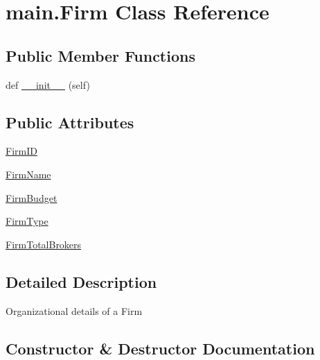 \hypertarget{classmain_1_1_firm}{}\section{main.\+Firm Class Reference}
\label{classmain_1_1_firm}
\subsection*{Public Member Functions}
\begin{DoxyCompactItemize}
\item 
def \hyperlink{classmain_1_1_firm_a214ed9603d9ff27e3e7d7458489d805d}{\+\_\+\+\_\+init\+\_\+\+\_\+} (self)
\end{DoxyCompactItemize}
\subsection*{Public Attributes}
\begin{DoxyCompactItemize}
\item 
\hyperlink{classmain_1_1_firm_a6052c1ccbd8ba8a8c7c7401ea8971343}{Firm\+I\+D}
\item 
\hyperlink{classmain_1_1_firm_a634868ce6def63b2a93c112f7e4e7c67}{Firm\+Name}
\item 
\hyperlink{classmain_1_1_firm_a8523fa1017684ff6c82f9d1dfc183135}{Firm\+Budget}
\item 
\hyperlink{classmain_1_1_firm_ab005092f1323f6b4426560dadd475e9e}{Firm\+Type}
\item 
\hyperlink{classmain_1_1_firm_a7a9582954ab4ae90b498a38e0cdec73e}{Firm\+Total\+Brokers}
\end{DoxyCompactItemize}


\subsection{Detailed Description}
\begin{DoxyVerb}Organizational details of a Firm\end{DoxyVerb}
 

\subsection{Constructor \& Destructor Documentation}
\hypertarget{classmain_1_1_firm_a214ed9603d9ff27e3e7d7458489d805d}{}
